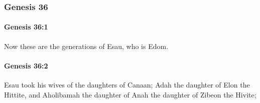 	\subsubsection{Genesis 36} %
		\label{GENESIS-36}

		\paragraph{Genesis 36:1} %
			\label{GENESIS-36-1}

			Now these are the generations of Esau, who is Edom.


		\paragraph{Genesis 36:2} %
			\label{GENESIS-36-2}

			Esau took his wives of the daughters of Canaan; Adah the daughter of Elon the Hittite, and Aholibamah the daughter of Anah the daughter of Zibeon the Hivite;

